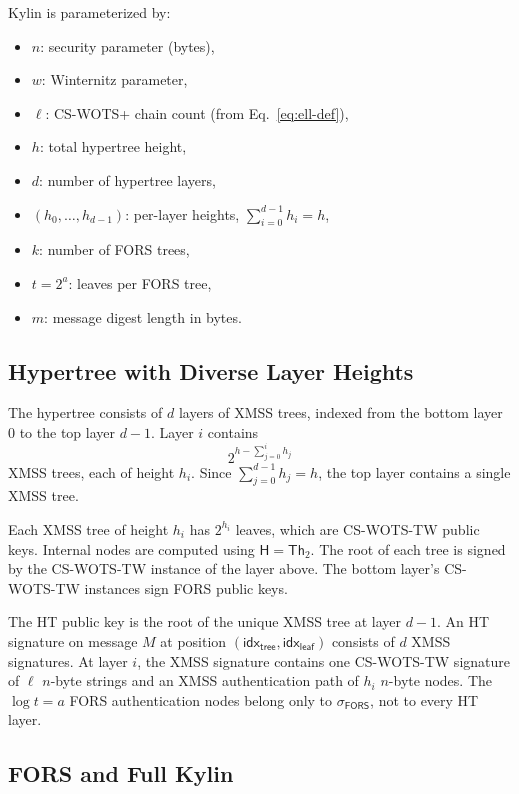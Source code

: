 \documentclass[11pt,a4paper]{article}
\newcommand{\Hfunc}{\mathsf{H}}
\newcommand{\Th}{\mathsf{Th}}
\begin{document}
Kylin is parameterized by:
\begin{itemize}
    \item $n$: security parameter (bytes),
    \item $w$: Winternitz parameter,
    \item $\ell$: CS-WOTS+ chain count (from Eq.~\eqref{eq:ell-def}),
    \item $h$: total hypertree height,
    \item $d$: number of hypertree layers,
    \item $(h_0, \ldots, h_{d-1})$: per-layer heights, $\sum_{i=0}^{d-1} h_i = h$,
    \item $k$: number of FORS trees,
    \item $t = 2^a$: leaves per FORS tree,
    \item $m$: message digest length in bytes.
\end{itemize}

\subsection{Hypertree with Diverse Layer Heights}

The hypertree consists of $d$ layers of XMSS trees, indexed from the bottom layer $0$ to the top layer $d-1$. Layer $i$ contains
\[
2^{h - \sum_{j=0}^{i} h_j}
\]
XMSS trees, each of height $h_i$. Since $\sum_{j=0}^{d-1}h_j=h$, the top layer contains a single XMSS tree.

Each XMSS tree of height $h_i$ has $2^{h_i}$ leaves, which are CS-WOTS-TW public keys. Internal nodes are computed using $\Hfunc = \Th_2$. The root of each tree is signed by the CS-WOTS-TW instance of the layer above. The bottom layer's CS-WOTS-TW instances sign FORS public keys.

The HT public key is the root of the unique XMSS tree at layer $d-1$. An HT signature on message $M$ at position $(\mathsf{idx}_{\mathsf{tree}}, \mathsf{idx}_{\mathsf{leaf}})$ consists of $d$ XMSS signatures. At layer $i$, the XMSS signature contains one CS-WOTS-TW signature of $\ell$ $n$-byte strings and an XMSS authentication path of $h_i$ $n$-byte nodes. The $\log t=a$ FORS authentication nodes belong only to $\sigma_{\mathsf{FORS}}$, not to every HT layer.

\subsection{FORS and Full Kylin}
\end{document}
